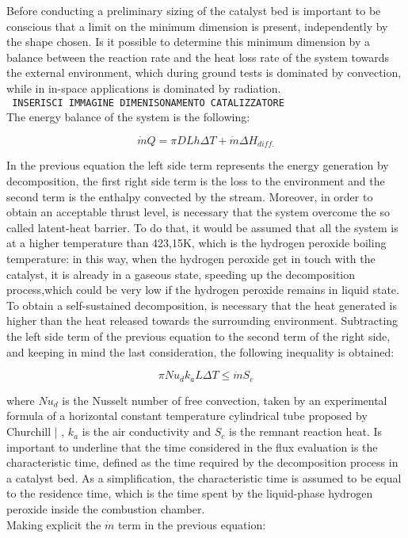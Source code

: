 \documentclass[a4paper]{report}
\begin{document}
Before conducting a preliminary sizing of the catalyst bed is important to be conscious that a limit on the minimum dimension is present, independently by the shape chosen. Is it possible to determine this minimum dimension by a balance between the reaction rate and the heat loss rate of the system towards the external environment, which during ground tests is dominated by convection, while in in-space applications is dominated by radiation.  \\ %

\texttt{\color{red} INSERISCI IMMAGINE DIMENISONAMENTO CATALIZZATORE} \\

The energy balance of the system is the following: 

\begin{equation}
\dot{m}Q = \pi DLh \Delta T + \dot{m} \Delta H_{diff.}
\end{equation}

In the previous equation the left side term represents the energy generation by decomposition, the first right side term is the loss to the environment and the second term is the enthalpy convected by the stream. Moreover, in order to obtain an acceptable thrust level, is necessary that the system overcome the so called latent-heat barrier. To do that, it would be assumed that all the system is at a higher temperature than 423,15K, which is the hydrogen peroxide boiling temperature: in this way, when the hydrogen peroxide get in touch with the catalyst, it is already in a gaseous state, speeding up the decomposition process,which could be very low if the hydrogen peroxide remains in liquid state. \\ 
To obtain a self-sustained decomposition, is necessary that the heat generated is higher than the heat released towards the surrounding environment. Subtracting the left side term of the previous equation to the second term of the right side, and keeping in mind the last consideration, the following inequality is obtained: 

\begin{equation}
\pi Nu_dk_aL\Delta T \leq \dot{m}S_c
\end{equation} 

where $Nu_d$ is the Nusselt number of free convection, taken by an experimental formula of a horizontal constant temperature cylindrical tube proposed by Churchill |%
, $k_a$ is the air conductivity and $S_c$ is the remnant reaction heat. Is important to underline that the time considered in the flux evaluation is the characteristic time, defined as the time required by the decomposition process in a catalyst bed.  As a simplification, the characteristic time is assumed to be equal to the residence time, which is the time spent by the liquid-phase hydrogen peroxide inside the combustion chamber. \\
Making explicit the $\dot{m}$ term in the previous equation: 
\end{document}
